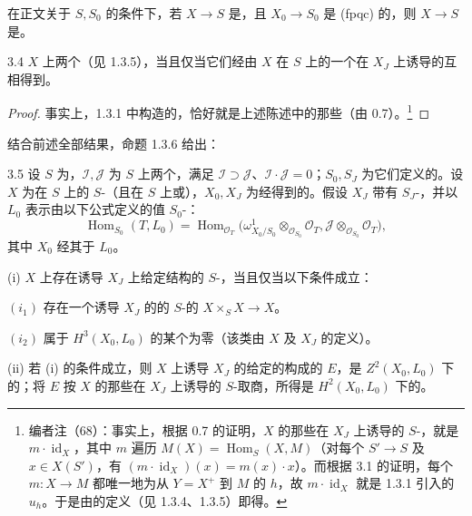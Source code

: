 在正文关于 $S,S_0$ 的条件下，若 $X\to S$ 是，且 $X_0\to S_0$ 是 (fpqc) 的，则 $X\to S$ 是。
\begin{SGAresult}{}{3.4}
$X$ 上两个（见 1.3.5），当且仅当它们经由 $X$ 在 $S$ 上的一个在 $X_J$ 上诱导的互相得到。
\end{SGAresult}
\begin{proof}
事实上，1.3.1 中构造的，恰好就是上述陈述中的那些（由 0.7）。\footnote{编者注（68）：事实上，根据 0.7 的证明，$X$ 的那些在 $X_J$ 上诱导的 $S$-，就是 $m\cdot\operatorname{id}_X$，其中 $m$ 遍历 $M(X)=\operatorname{Hom}_S(X,M)$（对每个 $S'\to S$ 及 $x\in X(S')$，有 $(m\cdot\operatorname{id}_X)(x)=m(x)\cdot x$）。而根据 3.1 的证明，每个 $m:X\to M$ 都唯一地为从 $Y=X^+$ 到 $M$ 的 $h$，故 $m\cdot\operatorname{id}_X$ 就是 1.3.1 引入的 $u_h$。于是由的定义（见 1.3.4、1.3.5）即得。}
\end{proof}
结合前述全部结果，命题 1.3.6 给出：
\begin{SGAresult}{}{3.5}
设 $S$ 为，$\mathcal I,\mathcal J$ 为 $S$ 上两个，满足 $\mathcal I\supset\mathcal J$、$\mathcal I\cdot\mathcal J=0$；$S_0,S_J$ 为它们定义的。设 $X$ 为在 $S$ 上的 $S$-（且在 $S$ 上或），$X_0,X_J$ 为经得到的。假设 $X_J$ 带有 $S_J$-，并以 $L_0$ 表示由以下公式定义的值 $S_0$-：
\[
 \operatorname{Hom}_{S_0}(T,L_0)=
 \operatorname{Hom}_{\mathcal O_T}
 \bigl(\omega^1_{X_0/S_0}\otimes_{\mathcal O_{S_0}}\mathcal O_T,
 \mathcal J\otimes_{\mathcal O_{S_0}}\mathcal O_T\bigr),
\]
其中 $X_0$ 经其于 $L_0$。

(i) $X$ 上存在诱导 $X_J$ 上给定结构的 $S$-，当且仅当以下条件成立：

$(i_1)$ 存在一个诱导 $X_J$ 的的 $S$-的 $X\times_S X\to X$。

$(i_2)$ 属于 $H^3(X_0,L_0)$ 的某个为零（该类由 $X$ 及 $X_J$ 的定义）。

(ii) 若 (i) 的条件成立，则 $X$ 上诱导 $X_J$ 的给定的构成的 $E$，是 $Z^2(X_0,L_0)$ 下的；将 $E$ 按 $X$ 的那些在 $X_J$ 上诱导的 $S$-取商，所得是 $H^2(X_0,L_0)$ 下的。
\end{SGAresult}
